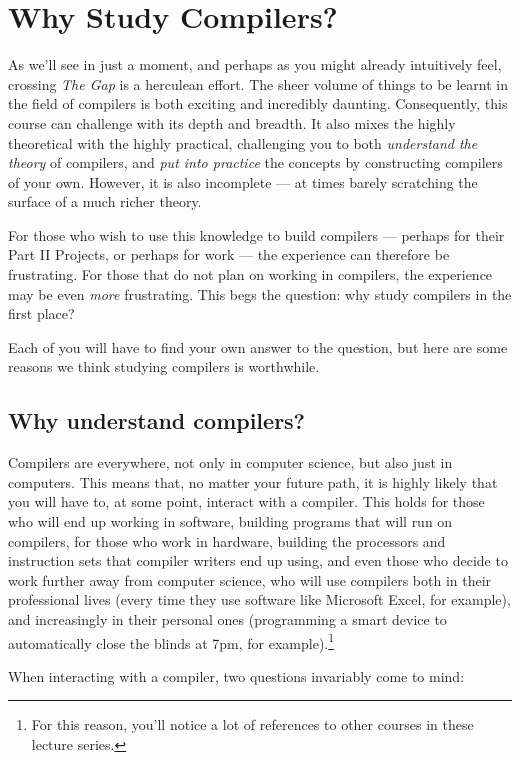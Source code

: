 \section{Why Study Compilers?}
As we'll see in just a moment, and perhaps as you might already intuitively feel, crossing \emph{The Gap} is a herculean effort. The sheer volume of things to be learnt in the field of compilers is both exciting and incredibly daunting. Consequently, this course can challenge with its depth and breadth. It also mixes the highly theoretical with the highly practical, challenging you to both \emph{understand the theory} of compilers, and \emph{put into practice} the concepts by constructing compilers of your own. However, it is also incomplete --- at times barely scratching the surface of a much richer theory.

For those who wish to use this knowledge to build compilers --- perhaps for their Part II Projects, or perhaps for work --- the experience can therefore be frustrating. For those that do not plan on working in compilers, the experience may be even \emph{more} frustrating. This begs the question: why study compilers in the first place?

Each of you will have to find your own answer to the question, but here are some reasons we think studying compilers is worthwhile. 

\subsection{Why understand compilers?}
Compilers are everywhere, not only in computer science, but also just in computers. This means that, no matter your future path, it is highly likely that you will have to, at some point, interact with a compiler. This holds for those who will end up working in software, building programs that will run on compilers, for those who work in hardware, building the processors and instruction sets that compiler writers end up using, and even those who decide to work further away from computer science, who will use compilers both in their professional lives (every time they use software like Microsoft Excel, for example), and increasingly in their personal ones (programming a smart device to automatically close the blinds at 7pm, for example).\footnote{For this reason, you'll notice a lot of references to other courses in these lecture series.}

When interacting with a compiler, two questions invariably come to mind:

